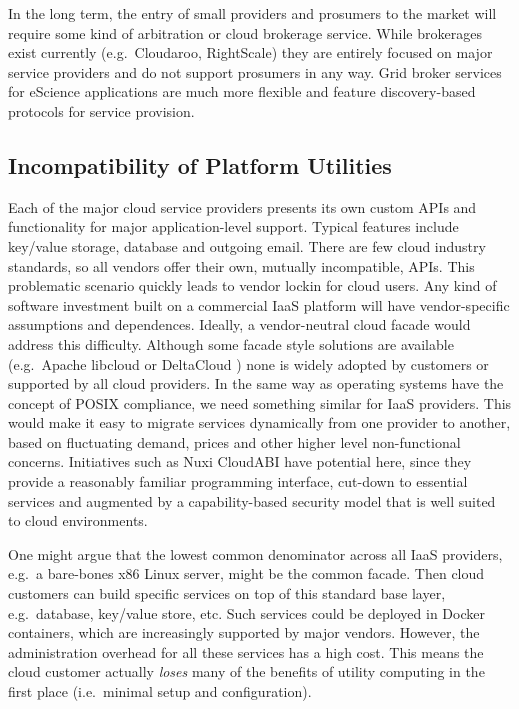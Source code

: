 \documentclass[conference,10pt]{IEEEtran}
\begin{document}
In the long term, the entry of small providers and prosumers to the market will require some kind of arbitration or cloud brokerage service. While brokerages exist currently (e.g.\ Cloudaroo, RightScale) they are entirely focused on major service providers and do not support prosumers in any way.
Grid broker services \cite{url4} for eScience applications are much more flexible and feature discovery-based protocols for service provision. 


\subsection{Incompatibility of Platform Utilities}

Each of the major cloud service providers presents its own custom APIs and functionality for major application-level support. Typical features include key/value storage, database and outgoing email.
There are few cloud industry standards, so all vendors offer their own, mutually incompatible, APIs.
This problematic scenario quickly leads to vendor lockin for cloud users. Any kind of software investment built on a commercial IaaS platform will have vendor-specific assumptions and dependences. 
Ideally, a vendor-neutral cloud facade \cite{martino15cross} would address this difficulty. Although some facade style solutions are available (e.g.\ Apache libcloud \cite{url5} or DeltaCloud \cite{url6}) none is widely adopted by customers or supported by all cloud providers.
In the same way as operating systems have the concept of POSIX compliance, we need something similar for IaaS providers. This would make it easy to migrate services dynamically from one provider to another, based on fluctuating demand, prices and other higher level non-functional concerns. Initiatives such as Nuxi CloudABI \cite{nuxi} have potential here, since they provide a reasonably familiar programming interface, cut-down to essential services and augmented by a capability-based security model that is well suited to cloud environments. 

One might argue that the lowest common denominator across all IaaS providers, e.g.\ a bare-bones x86 Linux server, might be the common facade. Then cloud customers can build specific services on top of this standard base layer, e.g.\ database, key/value store, etc. Such services could be deployed in Docker containers, which are increasingly supported by major vendors. However, the administration overhead for all these services has a high cost.
This means the cloud customer actually \emph{loses} many of the benefits of utility computing in the first place
(i.e.\ minimal setup and configuration).
\end{document}
